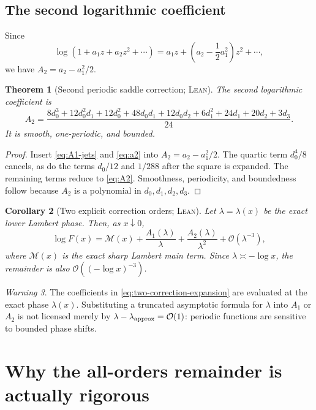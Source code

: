 \documentclass[11pt,oneside]{article}
\newtheorem{theorem}{Theorem}[section]
\newtheorem{corollary}[theorem]{Corollary}
\theoremstyle{definition}
\theoremstyle{remark}
\newtheorem{warning}[theorem]{Warning}
\newcommand{\bigO}{\mathcal O}
\newcommand{\Formalized}{\textsc{Lean}}
\newcommand{\Main}{\mathcal M}
\begin{document}
\subsection{The second logarithmic coefficient}

Since
\[
 \log(1+a_1z+a_2z^2+\cdots)
 =a_1z+\left(a_2-\frac12a_1^2\right)z^2+\cdots,
\]
we have $A_2=a_2-a_1^2/2$.

\begin{theorem}[Second periodic saddle correction; \Formalized]
\label{thm:A2}
The second logarithmic coefficient is
\begin{equation}
 \boxed{
 A_2=
 \frac{
  8d_0^3+12d_0^2d_1+12d_0^2+48d_0d_1+12d_0d_2
  +6d_1^2+24d_1+20d_2+3d_3
 }{24}.}
 \label{eq:A2}
\end{equation}
It is smooth, one-periodic, and bounded.
\end{theorem}

\begin{proof}
Insert \eqref{eq:A1-jets} and \eqref{eq:a2} into
$A_2=a_2-a_1^2/2$.  The quartic term $d_0^4/8$ cancels, as do the
terms $d_0/12$ and $1/288$ after the square is expanded.  The remaining
terms reduce to \eqref{eq:A2}.  Smoothness, periodicity, and boundedness
follow because $A_2$ is a polynomial in $d_0,d_1,d_2,d_3$.
\end{proof}

\begin{corollary}[Two explicit correction orders; \Formalized]
\label{cor:two-corrections}
Let $\lambda=\lambda(x)$ be the exact lower Lambert phase.  Then, as
$x\downarrow0$,
\begin{equation}
 \log F(x)
 =\Main(x)+\frac{A_1(\lambda)}{\lambda}
          +\frac{A_2(\lambda)}{\lambda^2}
          +\bigO(\lambda^{-3}), \label{eq:two-correction-expansion}
\end{equation}
where $\Main(x)$ is the exact sharp Lambert main term.  Since
$\lambda\asymp-\log x$, the remainder is also
$\bigO((-\log x)^{-3})$.
\end{corollary}

\begin{warning}
The coefficients in \eqref{eq:two-correction-expansion} are evaluated at
the exact phase $\lambda(x)$.  Substituting a truncated asymptotic formula
for $\lambda$ into $A_1$ or $A_2$ is not licensed merely by
$\lambda-\lambda_{\rm approx}=\bigO(1)$: periodic functions are sensitive
to bounded phase shifts.
\end{warning}


\section{Why the all-orders remainder is actually rigorous}
\label{sec:all-orders-proof}
\end{document}
